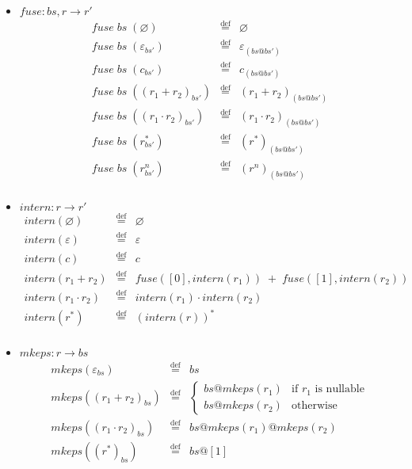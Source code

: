 \documentclass[12pt]{article}
\newcommand{\fuse}{\textit{fuse}}
\newcommand{\mkeps}{\textit{mkeps}}
\newcommand{\intern}{\textit{intern}}
\begin{document}
\begin{itemize}
\item $\fuse : bs, r \to r'$
  \[
  \begin{array}{rcl}
  \fuse\; bs\; (\varnothing)           & \stackrel{\text{def}}{=} & \varnothing \\
  \fuse\; bs\; (\varepsilon_{bs'})     & \stackrel{\text{def}}{=} & \varepsilon_{(bs @ bs')} \\
  \fuse\; bs\; (c_{bs'})               & \stackrel{\text{def}}{=} & c_{(bs @ bs')} \\
  \fuse\; bs\; ((r_1 + r_2)_{bs'} )      & \stackrel{\text{def}}{=} & (r_1 + r_2)_{(bs @ bs')} \\
  \fuse\; bs\; ((r_1 \cdot r_2)_{{bs'}})   & \stackrel{\text{def}}{=} & (r_1 \cdot r_2)_{(bs @ bs')} \\
  \fuse\; bs\; (r^*_{bs'})             & \stackrel{\text{def}}{=} & (r^*)_{(bs @ bs')} \\
  \fuse\; bs\; (r^n_{bs'})             & \stackrel{\text{def}}{=} & (r^n)_{(bs @ bs')} \\
  \end{array}
  \]

  \item $\intern : r \to r'$
    \[
    \begin{array}{rcl}
    \intern(\varnothing)     & \stackrel{\text{def}}{=} & \varnothing \\
    \intern(\varepsilon)     & \stackrel{\text{def}}{=} & \varepsilon \\
    \intern(c)               & \stackrel{\text{def}}{=} & c \\
    \intern(r_1 + r_2)       & \stackrel{\text{def}}{=} & \fuse([0], \intern(r_1)) \;+\; \fuse([1], \intern(r_2)) \\
    \intern(r_1 \cdot r_2)   & \stackrel{\text{def}}{=} & \intern(r_1) \cdot \intern(r_2) \\
    \intern(r^*)             & \stackrel{\text{def}}{=} & (\intern(r))^* \\
    \end{array}
    \]

  \item $\mkeps : r \to bs$
  \[
  \begin{array}{rcl}
  \mkeps(\varepsilon_{bs})            & \stackrel{\text{def}}{=} & bs \\
  \mkeps((r_1 + r_2)_{bs})            & \stackrel{\text{def}}{=} & 
       \begin{cases}
         bs @ \mkeps(r_1) & \text{if $r_1$ is nullable} \\
         bs @ \mkeps(r_2) & \text{otherwise}
       \end{cases} \\
  \mkeps((r_1 \cdot r_2)_{bs})        & \stackrel{\text{def}}{=} & bs @ \mkeps(r_1) @ \mkeps(r_2) \\
  \mkeps((r^*)_{bs})                  & \stackrel{\text{def}}{=} & bs @ [1] \\
  \end{array}
  \]


\end{itemize}
\end{document}

